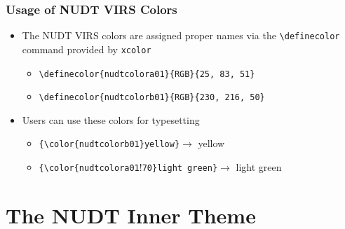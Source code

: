 \documentclass{beamer}
\begin{document}
\begin{frame}[fragile]
  \frametitle{Usage of NUDT VIRS Colors}
  \begin{itemize}
  \item The NUDT VIRS colors are assigned proper names via
    the \texttt{\textbackslash{}definecolor} command provided
    by \texttt{xcolor}
    \begin{itemize}
    \item \verb!\definecolor{nudtcolora01}{RGB}{25, 83, 51}!
    \item \verb!\definecolor{nudtcolorb01}{RGB}{230, 216, 50}!
    \end{itemize}
  \item Users can use these colors for typesetting
    \begin{itemize}
      \item \verb!{\color{nudtcolorb01}yellow}!$\rightarrow$ {\color{nudtcolorb01}yellow}
      \item \verb!{\color{nudtcolora01!!\verb!70}light green}!$\rightarrow$ {\color{nudtcolora01!70}light green}
    \end{itemize}
  \end{itemize}
\end{frame}

\section[Inner]{The NUDT Inner Theme}
\end{document}
